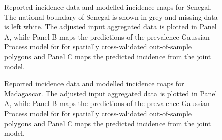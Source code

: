 \documentclass{statsoc}
\begin{document}
\begin{figure}
\caption{\label{predobsmapsen}
Reported incidence data and modelled incidence maps for Senegal. 
The national boundary of Senegal is shown in grey and missing data is left white.
The adjusted input aggregated data is plotted in Panel A, while Panel B maps the predictions of the prevalence Gaussian Process model for for spatially cross-validated out-of-sample polygons and Panel C maps the predicted incidence from the joint model.
}

\end{figure}



\begin{figure}
\caption{\label{predobsmapmdg}
Reported incidence data and modelled incidence maps for Madagascar. 
The adjusted input aggregated data is plotted in Panel A, while Panel B maps the predictions of the prevalence Gaussian Process model for for spatially cross-validated out-of-sample polygons and Panel C maps the predicted incidence from the joint model.
}

\end{figure}
\end{document}
